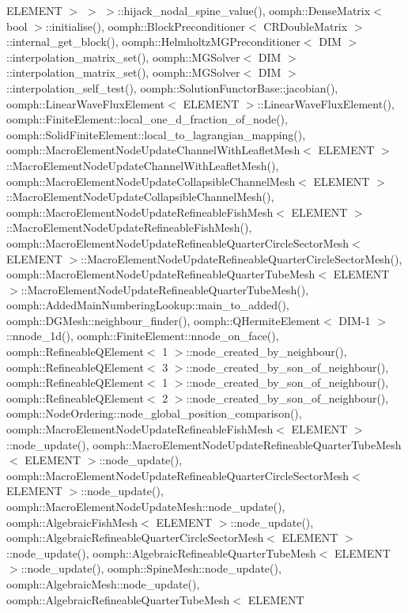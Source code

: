 E\+L\+E\+M\+E\+N\+T $>$ $>$ $>$\+::hijack\+\_\+nodal\+\_\+spine\+\_\+value(), oomph\+::\+Dense\+Matrix$<$ bool $>$\+::initialise(), oomph\+::\+Block\+Preconditioner$<$ C\+R\+Double\+Matrix $>$\+::internal\+\_\+get\+\_\+block(), oomph\+::\+Helmholtz\+M\+G\+Preconditioner$<$ D\+I\+M $>$\+::interpolation\+\_\+matrix\+\_\+set(), oomph\+::\+M\+G\+Solver$<$ D\+I\+M $>$\+::interpolation\+\_\+matrix\+\_\+set(), oomph\+::\+M\+G\+Solver$<$ D\+I\+M $>$\+::interpolation\+\_\+self\+\_\+test(), oomph\+::\+Solution\+Functor\+Base\+::jacobian(), oomph\+::\+Linear\+Wave\+Flux\+Element$<$ E\+L\+E\+M\+E\+N\+T $>$\+::\+Linear\+Wave\+Flux\+Element(), oomph\+::\+Finite\+Element\+::local\+\_\+one\+\_\+d\+\_\+fraction\+\_\+of\+\_\+node(), oomph\+::\+Solid\+Finite\+Element\+::local\+\_\+to\+\_\+lagrangian\+\_\+mapping(), oomph\+::\+Macro\+Element\+Node\+Update\+Channel\+With\+Leaflet\+Mesh$<$ E\+L\+E\+M\+E\+N\+T $>$\+::\+Macro\+Element\+Node\+Update\+Channel\+With\+Leaflet\+Mesh(), oomph\+::\+Macro\+Element\+Node\+Update\+Collapsible\+Channel\+Mesh$<$ E\+L\+E\+M\+E\+N\+T $>$\+::\+Macro\+Element\+Node\+Update\+Collapsible\+Channel\+Mesh(), oomph\+::\+Macro\+Element\+Node\+Update\+Refineable\+Fish\+Mesh$<$ E\+L\+E\+M\+E\+N\+T $>$\+::\+Macro\+Element\+Node\+Update\+Refineable\+Fish\+Mesh(), oomph\+::\+Macro\+Element\+Node\+Update\+Refineable\+Quarter\+Circle\+Sector\+Mesh$<$ E\+L\+E\+M\+E\+N\+T $>$\+::\+Macro\+Element\+Node\+Update\+Refineable\+Quarter\+Circle\+Sector\+Mesh(), oomph\+::\+Macro\+Element\+Node\+Update\+Refineable\+Quarter\+Tube\+Mesh$<$ E\+L\+E\+M\+E\+N\+T $>$\+::\+Macro\+Element\+Node\+Update\+Refineable\+Quarter\+Tube\+Mesh(), oomph\+::\+Added\+Main\+Numbering\+Lookup\+::main\+\_\+to\+\_\+added(), oomph\+::\+D\+G\+Mesh\+::neighbour\+\_\+finder(), oomph\+::\+Q\+Hermite\+Element$<$ D\+I\+M-\/1 $>$\+::nnode\+\_\+1d(), oomph\+::\+Finite\+Element\+::nnode\+\_\+on\+\_\+face(), oomph\+::\+Refineable\+Q\+Element$<$ 1 $>$\+::node\+\_\+created\+\_\+by\+\_\+neighbour(), oomph\+::\+Refineable\+Q\+Element$<$ 3 $>$\+::node\+\_\+created\+\_\+by\+\_\+son\+\_\+of\+\_\+neighbour(), oomph\+::\+Refineable\+Q\+Element$<$ 1 $>$\+::node\+\_\+created\+\_\+by\+\_\+son\+\_\+of\+\_\+neighbour(), oomph\+::\+Refineable\+Q\+Element$<$ 2 $>$\+::node\+\_\+created\+\_\+by\+\_\+son\+\_\+of\+\_\+neighbour(), oomph\+::\+Node\+Ordering\+::node\+\_\+global\+\_\+position\+\_\+comparison(), oomph\+::\+Macro\+Element\+Node\+Update\+Refineable\+Fish\+Mesh$<$ E\+L\+E\+M\+E\+N\+T $>$\+::node\+\_\+update(), oomph\+::\+Macro\+Element\+Node\+Update\+Refineable\+Quarter\+Tube\+Mesh$<$ E\+L\+E\+M\+E\+N\+T $>$\+::node\+\_\+update(), oomph\+::\+Macro\+Element\+Node\+Update\+Refineable\+Quarter\+Circle\+Sector\+Mesh$<$ E\+L\+E\+M\+E\+N\+T $>$\+::node\+\_\+update(), oomph\+::\+Macro\+Element\+Node\+Update\+Mesh\+::node\+\_\+update(), oomph\+::\+Algebraic\+Fish\+Mesh$<$ E\+L\+E\+M\+E\+N\+T $>$\+::node\+\_\+update(), oomph\+::\+Algebraic\+Refineable\+Quarter\+Circle\+Sector\+Mesh$<$ E\+L\+E\+M\+E\+N\+T $>$\+::node\+\_\+update(), oomph\+::\+Algebraic\+Refineable\+Quarter\+Tube\+Mesh$<$ E\+L\+E\+M\+E\+N\+T $>$\+::node\+\_\+update(), oomph\+::\+Spine\+Mesh\+::node\+\_\+update(), oomph\+::\+Algebraic\+Mesh\+::node\+\_\+update(), oomph\+::\+Algebraic\+Refineable\+Quarter\+Tube\+Mesh$<$ E\+L\+E\+M\+E\+N\+T 